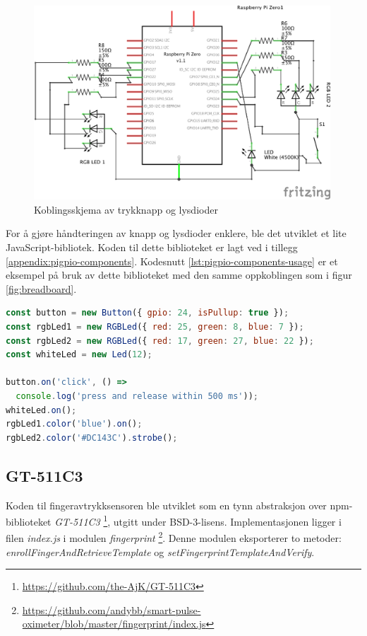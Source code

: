 \begin{figure}
\includegraphics[width=0.99\textwidth, center]{fig/prototype/schmeatic}
\caption{Koblingsskjema av trykknapp og lysdioder}
\label{fig:schematics}
\end{figure}

For å gjøre håndteringen av knapp og lysdioder enklere, ble det utviklet et lite JavaScript-bibliotek.
Koden til dette biblioteket er lagt ved i tillegg \ref{appendix:pigpio-components}. Kodesnutt
\ref{lst:pigpio-components-usage} er et eksempel på bruk av dette biblioteket med den samme oppkoblingen som i
figur \ref{fig:breadboard}.

\begin{lstlisting}[frame=single, language=JavaScript,
    caption=Bruk av pigpio-components, label=lst:pigpio-components-usage]
const button = new Button({ gpio: 24, isPullup: true });
const rgbLed1 = new RGBLed({ red: 25, green: 8, blue: 7 });
const rgbLed2 = new RGBLed({ red: 17, green: 27, blue: 22 });
const whiteLed = new Led(12);

button.on('click', () =>
  console.log('press and release within 500 ms'));
whiteLed.on();
rgbLed1.color('blue').on();
rgbLed2.color('#DC143C').strobe();
\end{lstlisting}

\subsection{GT-511C3}
Koden til fingeravtrykksensoren ble utviklet som en tynn abstraksjon over \gls{npm}-biblioteket \textit{GT-511C3}
\footnote{\url{https://github.com/the-AjK/GT-511C3}}, utgitt under BSD-3-lisens. Implementasjonen ligger
i filen \textit{index.js} i modulen \textit{fingerprint}
\footnote{\url{https://github.com/andybb/smart-pulse-oximeter/blob/master/fingerprint/index.js}}.
Denne modulen eksporterer to metoder: \textit{enrollFingerAndRetrieveTemplate} og \textit{setFingerprintTemplateAndVerify}.

